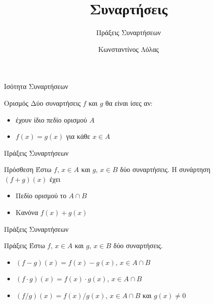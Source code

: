 \documentclass{presentation}
\title{Συναρτήσεις}
\subtitle{Πράξεις Συναρτήσεων}
\author[Λόλας]{Κωνσταντίνος Λόλας }
\institute[$10^ο$ ΓΕΛ]{$10^ο$ ΓΕΛ Θεσσαλονίκης}
\date{}
\begin{document}
\begin{frame}
      \titlepage
\end{frame}
\begin{frame}{Ισότητα Συναρτήσεων}
      \begin{block}{Ορισμός}
            Δύο συναρτήσεις $f$ και $g$ θα είναι ίσες αν:
            \begin{itemize}
                  \item έχουν ίδιο πεδίο ορισμού $Α$
                  \item $f(x)=g(x)$ για κάθε $x\in Α$
            \end{itemize}
      \end{block}
\end{frame}

\begin{frame}{Πράξεις Συναρτήσεων}
      \begin{block}{Πρόσθεση}
            Έστω $f$, $x\in Α$ και $g$, $x\in Β$ δύο συναρτήσεις. Η συνάρτηση $(f+g)(x)$ έχει
            \begin{itemize}
                  \item Πεδίο ορισμού το $A\cap Β$
                  \item Κανόνα $f(x)+g(x)$
            \end{itemize}
      \end{block}
\end{frame}

\begin{frame}{Πράξεις Συναρτήσεων}
      \begin{block}{Πράξεις}
            Έστω $f$, $x\in Α$ και $g$, $x\in Β$ δύο συναρτήσεις.
            \begin{itemize}
                  \item $(f-g)(x)=f(x)-g(x)$, $x\in A\cap Β$
                  \item $(f\cdot g)(x)=f(x)\cdot g(x)$, $x\in A\cap Β$
                  \item $(f/g)(x)=f(x)/g(x)$, $x\in A\cap Β$ και $g(x)\ne 0$
            \end{itemize}
      \end{block}
\end{frame}
\end{document}
